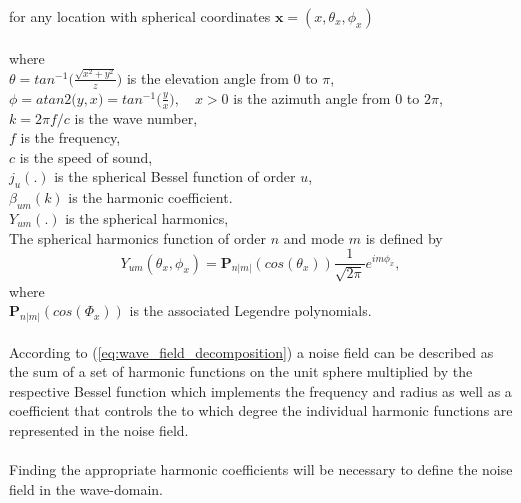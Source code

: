 for any location with spherical coordinates $\mathbf{x}=(x,\theta_x,\phi_x)$\\\\
where\\
$\theta = tan^{-1}\bigg(\frac{\sqrt{x^2+y^2}}{z}\bigg)$ is the elevation angle from $0$ to $\pi$,\\
$\phi = atan2\bigg(y,x\bigg) = tan^{-1}\bigg(\frac{y}{x}\bigg),\quad  x >0$ is the azimuth angle from $0$ to $2\pi$,\\
$k=2\pi f/c$ is the wave number,\\
$f$ is the frequency,\\
$c$ is the speed of sound,\\
$j_u(.)$ is the spherical Bessel function of order $u$,\\
$\beta_{um}(k)$ is the harmonic coefficient.\\ 
$Y_{um}(.)$ is the spherical harmonics,\\
The spherical harmonics function of order $n$ and mode $m$ is defined by\cite{Samarasinghe2018}
\begin{equation}
    Y_{um}(\theta_x,\phi_x) = \mathbf{P}_{n|m|}(cos(\theta_x))\frac{1}{\sqrt{2\pi}}e^{im\phi_x},
\end{equation}
where\\
$\mathbf{P}_{n|m|}(cos(\Phi_x))$ is the associated Legendre polynomials.\\\\

According to (\ref{eq:wave_field_decomposition}) a noise field can be described as the sum of a set of harmonic functions on the unit sphere multiplied by the respective Bessel function which implements the frequency and radius as well as a coefficient that controls the to which degree the individual harmonic functions are represented in the noise field.\\\\
Finding the appropriate harmonic coefficients will be necessary to define the noise field in the wave-domain.
